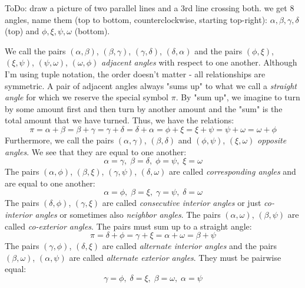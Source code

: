\medskip
ToDo: draw a picture of two parallel lines and a 3rd line crossing both. we get 8 angles, name them (top to bottom, counterclockwise, starting top-right): $\alpha, \beta, \gamma, \delta$ (top) and $\phi, \xi, \psi, \omega$ (bottom). 

\medskip
We call the pairs $(\alpha, \beta)$, $(\beta, \gamma)$, $(\gamma, \delta)$, $(\delta, \alpha)$ and the pairs $(\phi, \xi)$, $(\xi, \psi)$, $(\psi, \omega)$, $(\omega, \phi)$ \emph{adjacent angles} with respect to one another. Although I'm using tuple notation, the order doesn't matter - all relationships are symmetric. A pair of adjacent angles always "sums up" to what we call a \emph{straight angle} for which we reserve the special symbol $\pi$. By "sum up", we imagine to turn by some amount first and then turn by another amount and the "sum" is the total amount that we have turned. Thus, we have the relations:
\begin{equation}
  \pi = \alpha + \beta = \beta + \gamma = \gamma + \delta = \delta + \alpha 
      = \phi + \xi = \xi + \psi = \psi + \omega = \omega + \phi
\end{equation}
Furthermore, we call the pairs $(\alpha, \gamma)$, $(\beta, \delta)$ and $(\phi, \psi)$, $(\xi, \omega)$ \emph{opposite angles}. We see that they are equal to one another:
\begin{equation}
  \alpha = \gamma, \; \beta = \delta, \; \phi = \psi, \; \xi = \omega
\end{equation}
The pairs $(\alpha, \phi)$, $(\beta, \xi)$, $(\gamma, \psi)$, $(\delta, \omega)$ are called \emph{corresponding angles} and are equal to one another:
\begin{equation}
  \alpha = \phi, \; \beta = \xi, \; \gamma = \psi, \; \delta = \omega
\end{equation}
The pairs $(\delta, \phi)$, $(\gamma, \xi)$ are called \emph{consecutive interior angles} or just \emph{co-interior angles} or sometimes also \emph{neighbor angles}. The pairs  $(\alpha, \omega)$, $(\beta, \psi)$ are called \emph{co-exterior angles}. The pairs must sum up to a straight angle:
\begin{equation}
  \pi = \delta + \phi = \gamma + \xi = \alpha + \omega = \beta + \psi
\end{equation}
The pairs $(\gamma, \phi)$, $(\delta, \xi)$ are called \emph{alternate interior angles} and the pairs $(\beta, \omega)$, $(\alpha, \psi)$ are called \emph{alternate exterior angles}. They must be pairwise equal:
\begin{equation}
  \gamma = \phi, \; \delta = \xi, \; \beta = \omega, \; \alpha = \psi
\end{equation}
